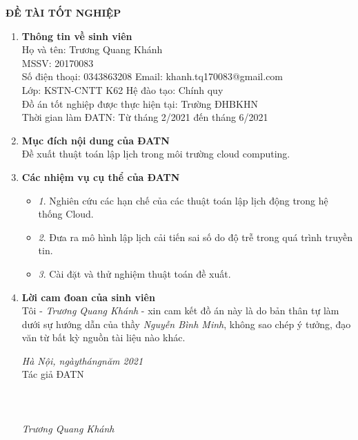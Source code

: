 \documentclass{my_style}
\begin{document}
\maketitle

\newpage
\begin{center}
\large \textbf{ĐỀ TÀI TỐT NGHIỆP}
\end{center}
\begin{enumerate}
\item \textbf{Thông tin về sinh viên} \\
Họ và tên: Trương Quang Khánh \\
MSSV: 20170083 \\
Số điện thoại: 0343863208 \hspace{50pt} Email: khanh.tq170083@gmail.com \\
Lớp: KSTN-CNTT K62 \hspace{86.5pt} Hệ đào tạo: Chính quy \\
Đồ án tốt nghiệp được thực hiện tại: Trường ĐHBKHN\\
Thời gian làm ĐATN: Từ tháng 2/2021 đến tháng 6/2021
\item \textbf{Mục đích nội dung của ĐATN} \\
Đề xuất thuật toán lập lịch trong môi trường cloud computing.
\item \textbf{Các nhiệm vụ cụ thể của ĐATN}
\begin{itemize}
\item \textit{1}. Nghiên cứu các hạn chế của các thuật toán lập lịch động trong hệ thống Cloud.
\item \textit{2}. Đưa ra mô hình lập lịch cải tiến sai số do độ trễ trong quá trình truyền tin. 
\item \textit{3}. Cài đặt và thử nghiệm thuật toán đề xuất.
\end{itemize}
\item \textbf{Lời cam đoan của sinh viên}\\
Tôi - \textit{Trương Quang Khánh} - xin cam kết đồ án này là do bản thân tự làm dưới sự hướng dẫn của thầy \textit{Nguyễn Bình Minh}, không sao chép ý tưởng, đạo văn từ bất kỳ nguồn tài liệu nào khác.  
\begin{adjustwidth}{200pt}{}
\begin{center}
\textit{Hà Nội, ngày\qquad tháng\qquad năm 2021}\\
Tác giả ĐATN \\
\leavevmode\\
\leavevmode\\
\leavevmode\\
\textit{Trương Quang Khánh}
\end{center}
\end{adjustwidth} 


\end{enumerate}
\end{document}
